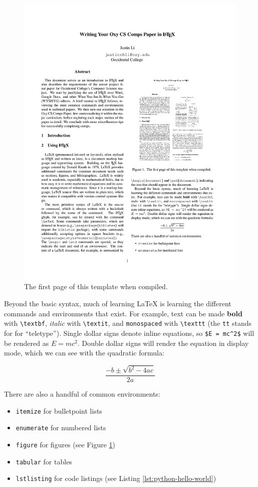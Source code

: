 \documentclass[10pt,twocolumn]{article}
\begin{document}
\begin{figure}
    \centering
    \includegraphics[width=.95\linewidth]{first-page.png}
    \caption{
        The first page of this template when compiled.
    }
    \label{fig:first-page}
\end{figure}

Beyond the basic syntax, much of learning LaTeX is learning the different commands and environments that exist.
For example, text can be made \textbf{bold} with \texttt{\textbackslash textbf}, \textit{italic} with \texttt{\textbackslash textit}, and \texttt{monospaced} with \texttt{\textbackslash texttt} (the \texttt{tt} stands for for ``teletype'').
Single dollar signs denote inline equations, so \texttt{\$E = mc\textasciicircum 2\$} will be rendered as $E = mc^2$.
Double dollar signs will render the equation in display mode, which we can see with the quadratic formula:

$$\frac{{-b \pm \sqrt {b^2 - 4ac} }}{{2a}}$$

There are also a handful of common environments:

\begin{itemize}
    \item \texttt{itemize} for bulletpoint lists
    \item \texttt{enumerate} for numbered lists
    \item \texttt{figure} for figures (see Figure \ref{fig:first-page})
    \item \texttt{tabular} for tables
    \item \texttt{lstlisting} for code listings (see Listing \ref{lst:python-hello-world})
\end{itemize}
\end{document}
